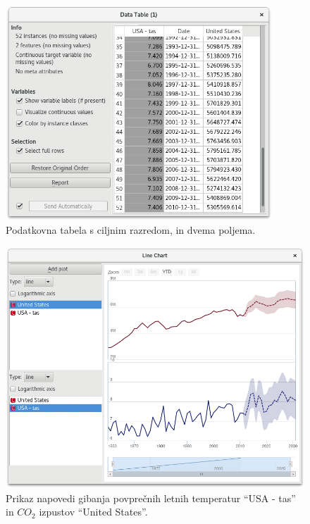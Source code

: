 \begin{figure}
\begin{center}
\includegraphics[width=10cm]{pic/var_data_table.png}
\end{center}
\caption{Podatkovna tabela s ciljnim razredom, in dvema poljema.}
\label{var_data_table}
\end{figure} 

\begin{figure}
\begin{center}
\includegraphics[width=13.75cm]{pic/var_forecast_graph.png}
\end{center}
\caption{Prikaz napovedi gibanja povprečnih letnih temperatur ``USA - tas'' in
  $CO_2$ izpustov ``United States''.}
\label{var_forecast_graph}
\end{figure} 




